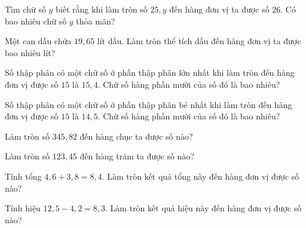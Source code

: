 \begin{ex}
  Tìm chữ số $y$ biết rằng khi làm tròn số $25{,}y$ đến hàng đơn vị ta được số $26$. Có bao nhiêu chữ số $y$ thỏa mãn?
\end{ex}

\begin{ex}
  Một can dầu chứa $19{,}65$ lít dầu. Làm tròn thể tích dầu đến hàng đơn vị ta được bao nhiêu lít?
\end{ex}

\begin{ex}
  Số thập phân có một chữ số ở phần thập phân lớn nhất khi làm tròn đến hàng đơn vị được số $15$ là $15{,}4$. Chữ số hàng phần mười của số đó là bao nhiêu?
\end{ex}

\begin{ex}
  Số thập phân có một chữ số ở phần thập phân bé nhất khi làm tròn đến hàng đơn vị được số $15$ là $14{,}5$. Chữ số hàng phần mười của số đó là bao nhiêu?
\end{ex}

\begin{ex}
  Làm tròn số $345{,}82$ đến hàng chục ta được số nào?
\end{ex}

\begin{ex}
  Làm tròn số $123{,}45$ đến hàng trăm ta được số nào?
\end{ex}

\begin{ex}
  Tính tổng $4{,}6 + 3{,}8 = 8{,}4$. Làm tròn kết quả tổng này đến hàng đơn vị được số nào?
\end{ex}

\begin{ex}
  Tính hiệu $12{,}5 - 4{,}2 = 8{,}3$. Làm tròn kết quả hiệu này đến hàng đơn vị được số nào?
\end{ex}

